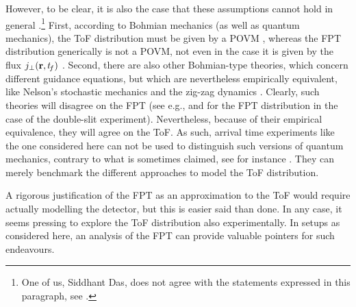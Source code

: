 \documentclass[11pt,a4paper]{article}
\newcommand{\tf}{t_{\!f}}
\begin{document}
However, to be clear, it is also the case that these assumptions cannot hold in general \cite{DDGZ,viale,DurrTeufel,Vona1,goldstein24}.{\footnote{One of us, Siddhant Das, does not agree with the statements expressed in this paragraph, see \cite{DA}.}} First, according to Bohmian mechanics (as well as quantum mechanics), the ToF distribution must be given by a POVM \cite[pp.\ 186-187]{tumulka22}, whereas the FPT distribution generically is not a POVM, not even in the case it is given by the flux \(j_\perp(\vb{r},\tf)\) \cite{Vona1}. Second, there are also other Bohmian-type theories, which concern different guidance equations, but which are nevertheless empirically equivalent, like Nelson's stochastic mechanics \cite{nelson66} and the zig-zag dynamics \cite{colin11,struyve12}. Clearly, such theories will disagree on the FPT (see e.g., \cite{NelsonDSE} and \cite{MAES2022127323} for the FPT distribution in the case of the double-slit experiment). Nevertheless, because of their empirical equivalence, they will agree on the ToF. As such, arrival time experiments like the one considered here can not be used to distinguish such versions of quantum mechanics, contrary to what is sometimes claimed, see for instance \cite{Ayatollah}. They can merely benchmark the different approaches to model the ToF distribution. 



A rigorous justification of the FPT as an approximation to the ToF would require actually modelling the detector, but this is easier said than done. In any case, it seems pressing to explore the ToF distribution also experimentally. In setups as considered here, an analysis of the FPT can provide valuable pointers for such endeavours.
\end{document}
